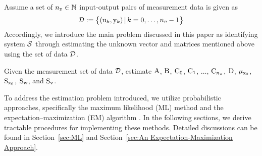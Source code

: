 Assume a set of $\nD\in\Nbb$ input-output pairs of measurement data is given as
\begin{equation}
    \Dcal:=\big\{(\vcu_k,\vcy_k)\,|\, k=0,\ldots,\nD-1\big\}
\end{equation}
Accordingly, we introduce the main problem discussed in this paper as identifying system ${\mathcal{S}}$ through estimating the unknown vector and matrices mentioned above using the set of data ${\mathcal{D}}$. 
\begin{problem*} \label{pr:Bilinear Observation}
Given the measurement set of data ${\mathcal{D}}$, 
estimate ${ \mathrm{A} }$, ${ \mathrm{B} }$, ${ \mathrm{C} }_0$, ${ \mathrm{C} }_1$, $\ldots$, ${ \mathrm{C} }_{n_{ \mathrm{u} }}$, ${ \mathrm{D} }$, $\mu_{{ \mathrm{x} }_0}$, ${ \mathrm{S} }_{{ \mathrm{x} }_0}$, ${ \mathrm{S} }_{{ \mathrm{w} }}$, and ${ \mathrm{S} }_{{ \mathrm{v} }}$.
\end{problem*}
To address the estimation problem introduced, we utilize probabilistic approaches, specifically the maximum likelihood (ML) method \cite{lehmann2006theory} and the expectation--maximization (EM) algorithm \cite{theodoridis2006pattern}. In the following sections, we derive tractable procedures for implementing these methods. 
Detailed discussions can be found in Section~\ref{sec:ML} and Section~\ref{sec:An Expectation-Maximization Approach}.